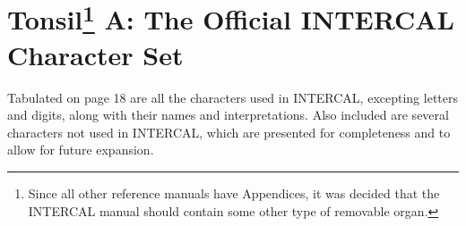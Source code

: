 



\section*{Tonsil\footnote{Since all other reference manuals
have Appendices, it was decided that the INTERCAL manual should contain
some other type of removable organ.} A:  The Official INTERCAL Character Set}






Tabulated on page 18 are all the characters used in INTERCAL, excepting
letters and digits, along with their names and interpretations.  Also
included are several characters not used in INTERCAL, which are presented
for completeness and to allow for future expansion.

